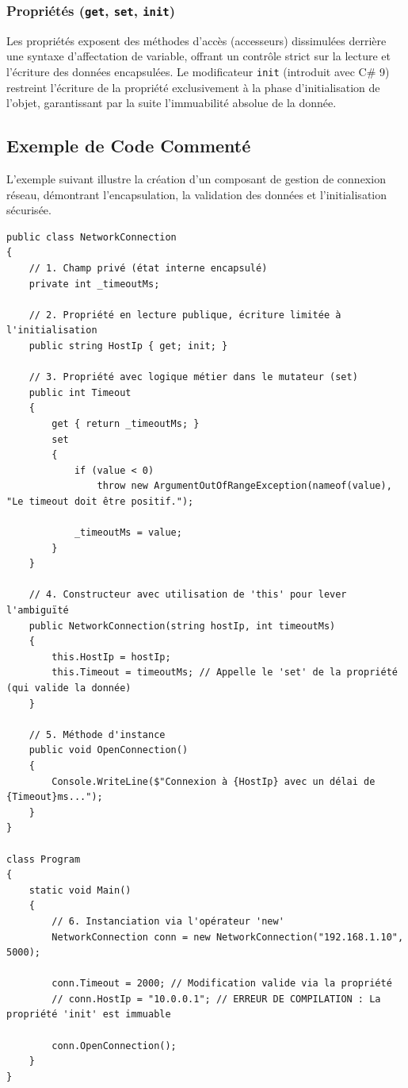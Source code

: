 \subsubsection{Propriétés (\texttt{get}, \texttt{set}, \texttt{init})}

Les propriétés exposent des méthodes d'accès (accesseurs) dissimulées derrière une syntaxe d'affectation de variable, offrant un contrôle strict sur la lecture et l'écriture des données encapsulées. Le modificateur \texttt{init} (introduit avec C\# 9) restreint l'écriture de la propriété exclusivement à la phase d'initialisation de l'objet, garantissant par la suite l'immuabilité absolue de la donnée.

\subsection{Exemple de Code Commenté}

L'exemple suivant illustre la création d'un composant de gestion de connexion réseau, démontrant l'encapsulation, la validation des données et l'initialisation sécurisée.

\begin{lstlisting}[caption={Implémentation d'un composant de connexion réseau}]
public class NetworkConnection
{
    // 1. Champ privé (état interne encapsulé)
    private int _timeoutMs;

    // 2. Propriété en lecture publique, écriture limitée à l'initialisation
    public string HostIp { get; init; }

    // 3. Propriété avec logique métier dans le mutateur (set)
    public int Timeout
    {
        get { return _timeoutMs; }
        set 
        { 
            if (value < 0)
                throw new ArgumentOutOfRangeException(nameof(value), "Le timeout doit être positif.");
            
            _timeoutMs = value;
        }
    }

    // 4. Constructeur avec utilisation de 'this' pour lever l'ambiguïté
    public NetworkConnection(string hostIp, int timeoutMs)
    {
        this.HostIp = hostIp;
        this.Timeout = timeoutMs; // Appelle le 'set' de la propriété (qui valide la donnée)
    }

    // 5. Méthode d'instance
    public void OpenConnection()
    {
        Console.WriteLine($"Connexion à {HostIp} avec un délai de {Timeout}ms...");
    }
}

class Program
{
    static void Main()
    {
        // 6. Instanciation via l'opérateur 'new'
        NetworkConnection conn = new NetworkConnection("192.168.1.10", 5000);
        
        conn.Timeout = 2000; // Modification valide via la propriété
        // conn.HostIp = "10.0.0.1"; // ERREUR DE COMPILATION : La propriété 'init' est immuable
        
        conn.OpenConnection();
    }
}
\end{lstlisting}

